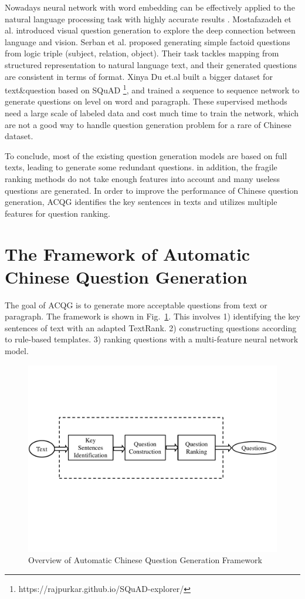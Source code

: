 \documentclass[runningheads,UTF8,article]{comsis2}
\newcommand\revised[1]{{\color{red} #1}}
\begin{document}
	
	Nowadays neural network with word embedding can be effectively applied to the natural language processing task with highly accurate results \cite{NIPS2016_6469,DBLP:journals/corr/VinyalsTBE14}. Mostafazadeh et al. \cite{mostafazadeh2016generating} introduced visual question generation to explore the deep connection between language and vision. Serban et al. \cite{serban2016generating} proposed generating simple factoid questions from logic triple (subject, relation, object). Their task tackles mapping from structured representation to natural language text, and their generated questions are consistent in terms of format. Xinya Du et.al \cite{DBLP:journals/corr/DuSC17} built a bigger dataset for text\&question based on SQuAD \footnote{https://rajpurkar.github.io/SQuAD-explorer/}, and trained a sequence to sequence network to generate questions on level on word and paragraph. These supervised methods need a large scale of labeled data and cost much time to train the network, which are not a good way to handle question generation problem for a rare of Chinese dataset.
	
	
	\revised{To conclude, most of the existing question generation models are based on full texts, leading to generate some redundant questions. in addition, the fragile ranking methods do not take enough features into account and many useless questions are generated. In order to improve the performance of Chinese question generation, ACQG identifies the key sentences in texts and utilizes multiple features for question ranking.}
	
	
	
	\section{The Framework of Automatic Chinese Question Generation}
	The goal of ACQG is to generate more acceptable questions from text or paragraph. The framework is shown in Fig.~\ref{framework}. This involves 1) identifying the key sentences of text with an adapted TextRank. 2) constructing questions according to rule-based templates. 3) ranking questions with a multi-feature neural network model.
	\begin{figure}[h]
		\centering\includegraphics[width=0.7\columnwidth]{framework.pdf}
		\caption{Overview of Automatic Chinese Question Generation Framework}
		\label{framework}
	\end{figure} 
	
\end{document}
